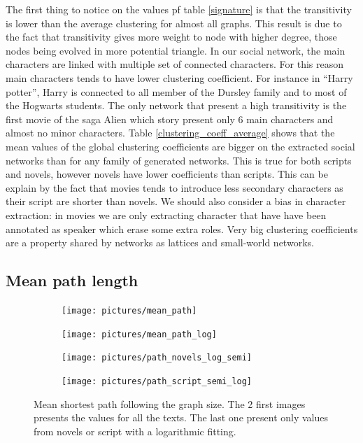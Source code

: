 \documentclass[a4paper, 12pt]{report}
\begin{document}
The first thing to notice on the values pf table \ref{signature} is that the transitivity is lower than the average clustering for almost all graphs. This result is due to the fact that transitivity gives more weight to node with higher degree, those nodes being evolved in more potential triangle. In our social network, the main characters are linked with multiple set of connected characters. For this reason main characters tends to have lower clustering coefficient. For instance in ``Harry potter'', Harry is connected to all member of the Dursley family and to most of the Hogwarts students. The only network that present a high transitivity is the first movie of the saga Alien which story present only 6 main characters and almost no minor characters. Table \ref{clustering_coeff_average} shows that the mean values of the global clustering coefficients are bigger on the extracted social networks than for any family of generated networks. This is true for both scripts and novels, however novels have lower coefficients than scripts. This can be explain by the fact that movies tends to introduce less secondary characters as their script are shorter than novels. We should also consider a bias in character extraction: in movies we are only extracting character that have have been annotated as speaker which erase some extra roles. Very big clustering coefficients are a property shared by networks as lattices and small-world networks.  \\


\subsection{Mean path length}
\begin{figure}
\begin{subfigure}{.49\textwidth}
\centering
\texttt{[image: pictures/mean\_path]}
\end{subfigure}
\hfill
\begin{subfigure}{.49\textwidth}
\centering
\texttt{[image: pictures/mean\_path\_log]}
\end{subfigure}
\hfill
\begin{subfigure}{.49\textwidth}
\centering
\texttt{[image: pictures/path\_novels\_log\_semi]}
\end{subfigure}
\hfill
\begin{subfigure}{.49\textwidth}
\centering
\texttt{[image: pictures/path\_script\_semi\_log]}
\end{subfigure}
\caption{Mean shortest path following the graph size. The 2 first images presents the values for all the texts. The last one present only values from novels or script with a logarithmic fitting. }
\label{mean_path}
\end{figure}
\end{document}
